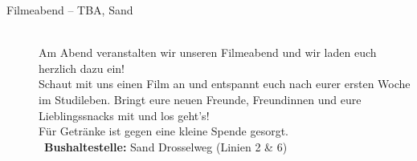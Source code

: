 \begin{description}


\ifml
\else
	\item[Filmeabend -- TBA, Sand]~\\
	Am Abend veranstalten wir unseren Filmeabend und wir laden euch herzlich dazu ein!\\
	Schaut mit uns einen Film an und entspannt euch nach eurer ersten Woche im Studileben.
	Bringt eure neuen Freunde, Freundinnen und eure Lieblingssnacks mit und los geht's!\\
	Für Getränke ist gegen eine kleine Spende gesorgt.\\
	~\textbf{Bushaltestelle:} Sand Drosselweg (Linien 2 \& 6)
\fi


\end{description}

